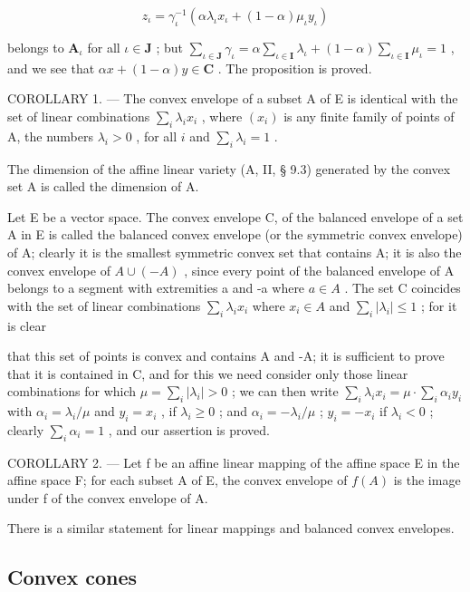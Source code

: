 \[
z _ {\iota} = \gamma_ {\iota} ^ {- 1} (\alpha \lambda_ {\iota} x _ {\iota} + (1 - \alpha) \mu_ {\iota} y _ {\iota})
\]

belongs to \(\mathbf{A}_{\iota}\) for all \(\iota \in \mathbf{J}\) ; but \(\sum_{\iota \in \mathbf{J}} \gamma_{\iota} = \alpha \sum_{\iota \in \mathbf{I}} \lambda_{\iota} + (1 - \alpha) \sum_{\iota \in \mathbf{I}} \mu_{\iota} = 1\) , and we see that \(\alpha x + (1 - \alpha)y \in \mathbf{C}\) . The proposition is proved.

COROLLARY 1. --- The convex envelope of a subset A of E is identical with the set of linear combinations \(\sum_{i} \lambda_{i} x_{i}\) , where \((x_{i})\) is any finite family of points of A, the numbers \(\lambda_{i} > 0\) , for all \(i\) and \(\sum_{i} \lambda_{i} = 1\) .

The dimension of the affine linear variety (A, II, § 9.3) generated by the convex set A is called the dimension of A.

Let E be a vector space. The convex envelope C, of the balanced envelope of a set A in E is called the balanced convex envelope (or the symmetric convex envelope) of A; clearly it is the smallest symmetric convex set that contains A; it is also the convex envelope of \(A \cup (-A)\) , since every point of the balanced envelope of A belongs to a segment with extremities a and -a where \(a \in A\) . The set C coincides with the set of linear combinations \(\sum_{i} \lambda_{i} x_{i}\) where \(x_{i} \in A\) and \(\sum_{i} |\lambda_{i}| \leqslant 1\) ; for it is clear

that this set of points is convex and contains A and -A; it is sufficient to prove that it is contained in C, and for this we need consider only those linear combinations for which \(\mu = \sum_{i} |\lambda_{i}| > 0\) ; we can then write \(\sum_{i} \lambda_{i} x_{i} = \mu \cdot \sum_{i} \alpha_{i} y_{i}\) with \(\alpha_{i} = \lambda_{i} / \mu\) and \(y_{i} = x_{i}\) , if \(\lambda_{i} \geqslant 0\) ; and \(\alpha_{i} = -\lambda_{i} / \mu\) ; \(y_{i} = -x_{i}\) if \(\lambda_{i} < 0\) ; clearly \(\sum_{i} \alpha_{i} = 1\) , and our assertion is proved.

COROLLARY 2. --- Let f be an affine linear mapping of the affine space E in the affine space F; for each subset A of E, the convex envelope of \(f(A)\) is the image under f of the convex envelope of A.

There is a similar statement for linear mappings and balanced convex envelopes.

\subsection{Convex cones}

